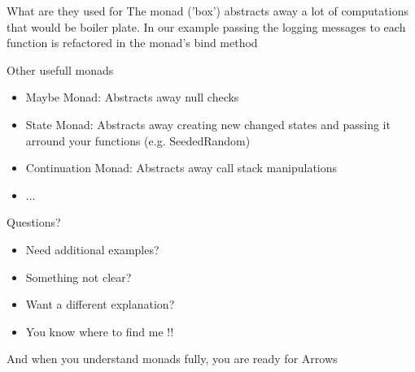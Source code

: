 \begin{frame}[fragile]{}
    \begin{block}{What are they used for}
        The monad ('box') abstracts away a lot of computations that would be boiler plate.
        In our example passing the logging messages to each function is refactored in the monad's bind method
    \end{block}
\end{frame}

\begin{frame}[t]{}
    \begin{block}{Other usefull monads}
        \begin{itemize}
            \item Maybe Monad: Abstracts away null checks
            \item State Monad: Abstracts away creating new changed states and passing it arround your functions (e.g.  SeededRandom)
            \item Continuation Monad: Abstracts away call stack manipulations
            \item ...
        \end{itemize}
    \end{block}
\end{frame}

\begin{frame}[t]{}
    \begin{block}{Questions?}
        \begin{itemize}
            \item Need additional examples?
            \item Something not clear?
            \item Want a different explanation?
            \item You know where to find me !!
        \end{itemize}
    \end{block}
    \begin{block}{}
        And when you understand monads fully, you are ready for Arrows
    \end{block}
\end{frame}
